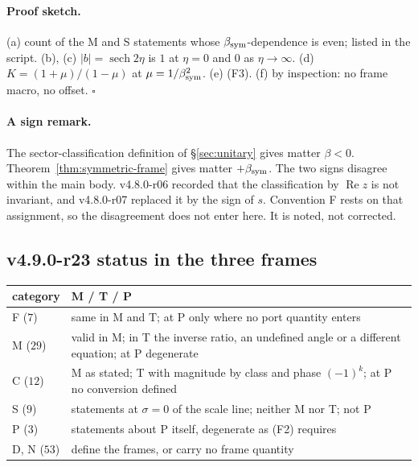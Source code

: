 \paragraph{Proof sketch.}
(a) count of the M and S statements whose \(\beta_{\mathrm{sym}}\)-dependence is even; listed in the script.  (b), (c) \(|b|=\operatorname{sech}2\eta\) is \(1\) at
\(\eta=0\) and \(0\) as \(\eta\to\infty\).  (d) \(K=(1+\mu)/(1-\mu)\) at \(\mu=1/\beta_{\mathrm{sym}}^2\).  (e) (F3).  (f) by inspection: no frame macro, no
offset.  \(\square\)

\paragraph{A sign remark.}
The sector-classification definition of \S\ref{sec:unitary} gives matter \(\beta<0\).  Theorem~\ref{thm:symmetric-frame} gives matter
\(+\beta_{\mathrm{sym}}\).  The two signs disagree within the main body.  v4.8.0-r06 recorded that the classification by \(\operatorname{Re}z\) is not
invariant, and v4.8.0-r07 replaced it by the sign of \(s\).  Convention F rests on that assignment, so the disagreement does not
enter here.  It is noted, not corrected.

\subsection*{v4.9.0-r23 status in the three frames}
\label{subsec:v490-r23-frames}

\begin{center}
\small
\begin{tabular}{@{}>{\raggedright\arraybackslash}p{}>{\raggedright\arraybackslash}p{}@{}}
\toprule
category & M / T / P\\
\midrule
F (\(7\)) & same in M and T; at P only where no port quantity enters\\
M (\(29\)) & valid in M; in T the inverse ratio, an undefined angle or a different equation; at P degenerate\\
C (\(12\)) & M as stated; T with magnitude by class and phase \((-1)^k\); at P no conversion defined\\
S (\(9\)) & statements at \(\sigma=0\) of the scale line; neither M nor T; not P\\
P (\(3\)) & statements about P itself, degenerate as (F2) requires\\
D, N (\(53\)) & define the frames, or carry no frame quantity\\
\bottomrule
\end{tabular}
\end{center}

